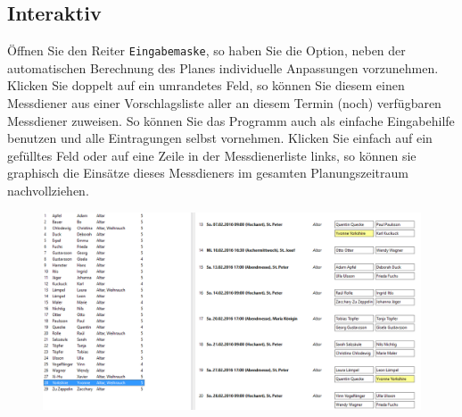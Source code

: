 \documentclass[a4paper,11pt]{article}
\begin{document}
\subsection{Interaktiv}
Öffnen Sie den Reiter \texttt{Eingabemaske}, so haben Sie die Option, neben der automatischen Berechnung des Planes individuelle Anpassungen vorzunehmen. Klicken Sie doppelt auf ein umrandetes Feld, so können Sie diesem einen Messdiener aus einer Vorschlagsliste aller an diesem Termin (noch) verfügbaren Messdiener zuweisen. So können Sie das Programm auch als einfache Eingabehilfe benutzen und alle Eintragungen selbst vornehmen. Klicken Sie einfach auf ein gefülltes Feld oder auf eine Zeile in der Messdienerliste links, so können sie graphisch die Einsätze dieses Messdieners im gesamten Planungszeitraum nachvollziehen.
\begin{figure}[h]
\includegraphics[scale=0.4]{highlight2.PNG}
\end{figure}
\end{document}
